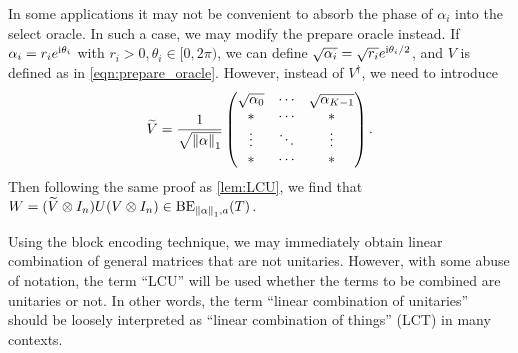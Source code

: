 \begin{rem}
In some applications it may not be convenient to absorb the phase of $\alpha_i$ into the select oracle. In such a case, we may modify the prepare oracle instead. 
If $\alpha_i=r_i e^{\mathrm{i} \theta_i}$ with $r_i>0,\theta_i\in[0,2\pi)$, we can define $\sqrt{\alpha_i}=\sqrt{r_i} e^{\mathrm{i} \theta_i/2}$, and $V$ is defined as in \cref{eqn:prepare_oracle}. 
However, instead of $V^{\dag}$, we need to introduce
\begin{equation}
\widetilde{V}=\frac{1}{\sqrt{\left\lVert\alpha\right\rVert_1}}\begin{pmatrix}
\sqrt{\alpha_0} & \cdots & \sqrt{\alpha_{K-1}}\\
* & \cdots & * \\
\vdots & \ddots & \vdots \\
* & \cdots & *
\end{pmatrix}.
\end{equation}
Then following the same proof as \cref{lem:LCU}, we find that 
$W=(\widetilde{V}\otimes I_n) U(V\otimes I_n)\in\operatorname{BE}_{\left\lVert\alpha\right\rVert_1,a}(T)$. 


\end{rem}


\begin{rem}
Using the block encoding technique, we may immediately obtain linear combination of general matrices that are not unitaries. 
However, with some abuse of notation, the term ``LCU'' will be used whether the terms to be combined are unitaries or not. 
In other words, the term ``linear combination of unitaries'' should be loosely interpreted as ``linear combination of things'' (LCT) in many contexts.
\end{rem}

